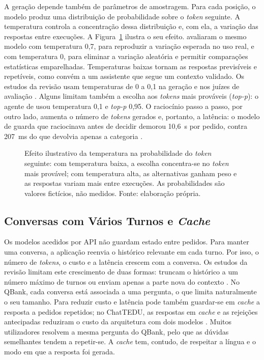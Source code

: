 A geração depende também de parâmetros de amostragem. Para cada posição, o modelo produz uma distribuição de probabilidade sobre o \emph{token} seguinte. A temperatura controla a concentração dessa distribuição e, com ela, a variação das respostas entre execuções. A Figura~\ref{fig:temperature} ilustra o seu efeito. \textcite{ahmed2026auditing} avaliaram o mesmo modelo com temperatura 0,7, para reproduzir a variação esperada no uso real, e com temperatura 0, para eliminar a variação aleatória e permitir comparações estatísticas emparelhadas. Temperaturas baixas tornam as respostas previsíveis e repetíveis, como convém a um assistente que segue um contexto validado. Os estudos da revisão usam temperaturas de 0 a 0,1 na geração \parencite{yan2026question,xie2026when} e nos juízes de avaliação \parencite{buti2026evaluating,bellard2025development}. Alguns limitam também a escolha aos \emph{tokens} mais prováveis (\emph{top-p}): o agente de \textcite{yan2026question} usou temperatura 0,1 e \emph{top-p} 0,95. O raciocínio passo a passo, por outro lado, aumenta o número de \emph{tokens} gerados e, portanto, a latência: o modelo de guarda que raciocinava antes de decidir demorou 10,6~s por pedido, contra 207~ms do que devolvia apenas a categoria \parencite{walczak2026comparative}.

\begin{figure}[htbp]
\centering

\caption[Efeito da temperatura na escolha do token seguinte]{Efeito ilustrativo da temperatura na probabilidade do \emph{token} seguinte: com temperatura baixa, a escolha concentra-se no \emph{token} mais provável; com temperatura alta, as alternativas ganham peso e as respostas variam mais entre execuções. As probabilidades são valores fictícios, não medidos. Fonte: elaboração própria.}
\label{fig:temperature}
\end{figure}

\subsection{Conversas com Vários Turnos e \emph{Cache}}
\label{sec:chap2_memory}

Os modelos acedidos por \gls{API} não guardam estado entre pedidos. Para manter uma conversa, a aplicação reenvia o histórico relevante em cada turno. Por isso, o número de \emph{tokens}, o custo e a latência crescem com a conversa. Os estudos da revisão limitam este crescimento de duas formas: truncam o histórico a um número máximo de turnos \parencite{yan2026question} ou enviam apenas a parte nova do contexto \parencite{liu2026asknow}. No QBank, cada conversa está associada a uma pergunta, o que limita naturalmente o seu tamanho. Para reduzir custo e latência pode também guardar-se em \emph{cache} a resposta a pedidos repetidos; no ChatTEDU, as respostas em \emph{cache} e as rejeições antecipadas reduziram o custo da arquitetura com dois modelos \parencite{emekci2025securing}. Muitos utilizadores resolvem a mesma pergunta do QBank, pelo que as dúvidas semelhantes tendem a repetir-se. A \emph{cache} tem, contudo, de respeitar a língua e o modo em que a resposta foi gerada.

